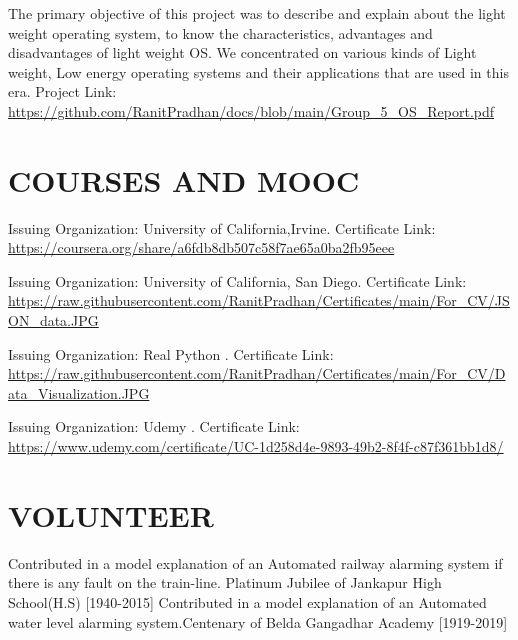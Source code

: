 \documentclass[11pt,a4paper,sans]{moderncv}        %
\begin{document}
{The primary objective of this project was to  describe  and  explain about the light weight operating system, to know the characteristics, advantages and disadvantages of light weight OS. We concentrated on various kinds of Light weight, Low energy operating  systems and  their  applications  that  are used in this era.{\newline} 
Project Link:{\newline}
\url{https://github.com/RanitPradhan/docs/blob/main/Group_5_OS_Report.pdf}}{}


\section{COURSES AND MOOC}
{Issuing Organization: University of California,Irvine.{\newline}
Certificate Link:
\url{ https://coursera.org/share/a6fdb8db507c58f7ae65a0ba2fb95eee}}{}

{Issuing Organization: University of California, San Diego.{\newline}
Certificate Link:
\url{https://raw.githubusercontent.com/RanitPradhan/Certificates/main/For_CV/JSON_data.JPG}}{}

{Issuing Organization: Real Python .{\newline}
Certificate Link: \url{https://raw.githubusercontent.com/RanitPradhan/Certificates/main/For_CV/Data_Visualization.JPG}}{}

{Issuing Organization: Udemy .{\newline}
Certificate Link: 
\url{https://www.udemy.com/certificate/UC-1d258d4e-9893-49b2-8f4f-c87f361bb1d8/}}{}


\section{VOLUNTEER}
{Contributed in a model explanation of an Automated railway alarming system if there is any fault on the train-line. 
Platinum Jubilee of Jankapur High School(H.S) [1940-2015]}
{Contributed in a model explanation of an Automated water level alarming system.Centenary of Belda Gangadhar Academy  [1919-2019]}
\end{document}
